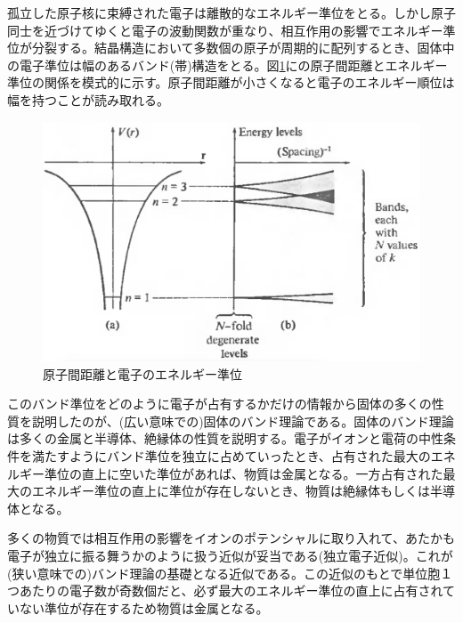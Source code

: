 孤立した原子核に束縛された電子は離散的なエネルギー準位をとる。しかし原子同士を近づけてゆくと電子の波動関数が重なり、相互作用の影響でエネルギー準位が分裂する。結晶構造において多数個の原子が周期的に配列するとき、固体中の電子準位は幅のあるバンド(帯)構造をとる。図\ref{fig:band}にの原子間距離とエネルギー準位の関係を模式的に示す。原子間距離が小さくなると電子のエネルギー順位は幅を持つことが読み取れる。
\begin{figure}[!h]
    \begin{center}
   \includegraphics[width=0.7\hsize]{Introduction/band.eps}
  \end{center}
  \caption{原子間距離と電子のエネルギー準位\cite{ashcroft1976}}
  \label{fig:band}
\end{figure}

このバンド準位をどのように電子が占有するかだけの情報から固体の多くの性質を説明したのが、(広い意味での)固体のバンド理論である。固体のバンド理論は多くの金属と半導体、絶縁体の性質を説明する。電子がイオンと電荷の中性条件を満たすようにバンド準位を独立に占めていったとき、占有された最大のエネルギー準位の直上に空いた準位があれば、物質は金属となる。一方占有された最大のエネルギー準位の直上に準位が存在しないとき、物質は絶縁体もしくは半導体となる。

多くの物質では相互作用の影響をイオンのポテンシャルに取り入れて、あたかも電子が独立に振る舞うかのように扱う近似が妥当である(独立電子近似)\cite{ashcroft1976}。これが(狭い意味での)バンド理論の基礎となる近似である。この近似のもとで単位胞１つあたりの電子数が奇数個だと、必ず最大のエネルギー準位の直上に占有されていない準位が存在するため物質は金属となる。

